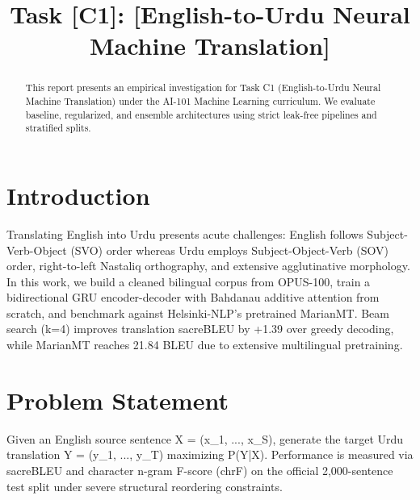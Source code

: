 \documentclass[conference]{IEEEtran}
\begin{document}
\title{Task [C1]: [English-to-Urdu Neural Machine Translation]}

\author{
}

\maketitle

\begin{abstract}
This report presents an empirical investigation for Task C1 (English-to-Urdu Neural Machine Translation) under the AI-101 Machine Learning curriculum. We evaluate baseline, regularized, and ensemble architectures using strict leak-free pipelines and stratified splits.
\end{abstract}

\section{Introduction}
Translating English into Urdu presents acute challenges: English follows Subject-Verb-Object (SVO) order whereas Urdu employs Subject-Object-Verb (SOV) order, right-to-left Nastaliq orthography, and extensive agglutinative morphology. In this work, we build a cleaned bilingual corpus from OPUS-100, train a bidirectional GRU encoder-decoder with Bahdanau additive attention from scratch, and benchmark against Helsinki-NLP's pretrained MarianMT. Beam search (k=4) improves translation sacreBLEU by +1.39 over greedy decoding, while MarianMT reaches 21.84 BLEU due to extensive multilingual pretraining.

\section{Problem Statement}
Given an English source sentence X = (x_1, ..., x_S), generate the target Urdu translation Y = (y_1, ..., y_T) maximizing P(Y|X). Performance is measured via sacreBLEU and character n-gram F-score (chrF) on the official 2,000-sentence test split under severe structural reordering constraints.
\end{document}
